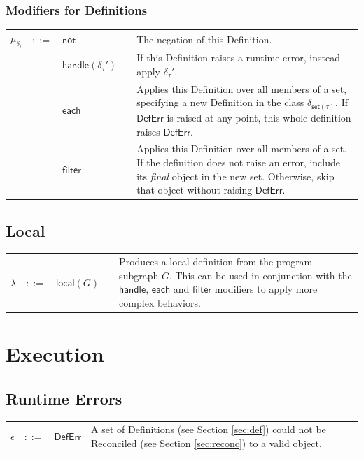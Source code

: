 \documentclass[twoside,openright,11pt]{report}
\begin{document}
\subsection{Modifiers for Definitions}
\label{subsec:mods-defs}

\noindent\begin{tabularx}{\textwidth}{p{0.5cm} p{0.5cm} p{5cm} c X}
$\mu_{\delta_\tau}$ & $::=$ & $\mathsf{not}$ &  & The negation of this Definition. \\
 & & $\mathsf{handle}(\delta_\tau')$ &  & If this Definition raises a runtime error, instead apply $\delta_\tau'$. \\
 & & $\mathsf{each}$ &  & Applies this Definition over all members of a set, specifying a new Definition in the class $\delta_{\mathsf{set}(\tau)}$. If $\mathsf{DefErr}$ is raised at any point, this whole definition raises $\mathsf{DefErr}$. \\
 & & $\mathsf{filter}$ &  & Applies this Definition over all members of a set. If the definition does not raise an error, include its {\it final} object in the new set. Otherwise, skip that object without raising $\mathsf{DefErr}$. \\
\end{tabularx}

\section{Local}
\label{sec:local}
\noindent\begin{tabularx}{\textwidth}{p{0.5cm} p{0.5cm} p{5cm} c X}
$\lambda$ & $::=$ & $\mathsf{local}(G)$ &  & Produces a local definition from the program subgraph $G$. This can be used in conjunction with the $\mathsf{handle}$, $\mathsf{each}$ and $\mathsf{filter}$ modifiers to apply more complex behaviors.\\
\end{tabularx}


\chapter{Execution}
\label{chap:exec}

\section{Runtime Errors}
\label{sec:runtime-errors}

\begin{tabularx}{\textwidth}{l l l X}
$\epsilon$ & $::=$ & $\mathsf{DefErr}$ & A set of Definitions (see Section \ref{sec:def}) could not be Reconciled (see Section \ref{sec:reconc}) to a valid object.
\end{tabularx}
\end{document}
